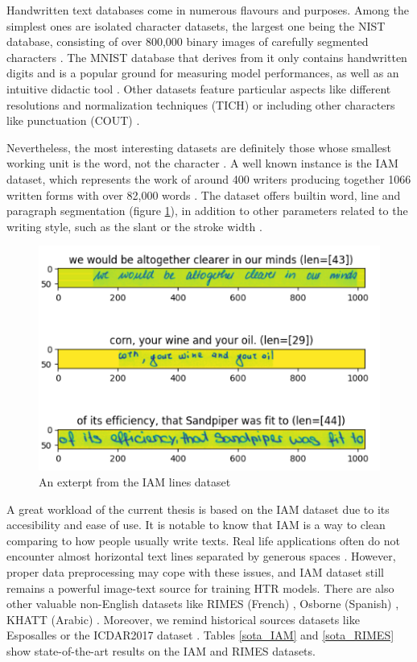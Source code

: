 Handwritten text databases come in numerous flavours and purposes. Among the simplest ones are isolated character datasets, the largest one being the NIST database, consisting of over 800,000 binary images of carefully segmented characters \cite{Juan}. The MNIST database that derives from it only contains handwritten digits and is a popular ground for measuring model performances, as well as an intuitive didactic tool \cite{Juan}. Other datasets feature particular aspects like different resolutions and normalization techniques (TICH) or including other characters like punctuation (COUT) \cite{Juan}.

Nevertheless, the most interesting datasets are definitely those whose smallest working unit is the word, not the character \cite{Juan}. A well known instance is the IAM dataset, which represents the work of around 400 writers producing together 1066 written forms with over 82,000 words \cite{IAM}. The dataset offers builtin word, line and paragraph segmentation (figure \ref{FigIAMExterpt}), in addition to other parameters related to the writing style, such as the slant or the stroke width \cite{IAM}.

\begin{figure}[htbp]
    \centering
        \includegraphics[scale=0.7]{figures/IAM_preview}
    \caption{An exterpt from the IAM lines dataset}
    \label{FigIAMExterpt}        
\end{figure}

A great workload of the current thesis is based on the IAM dataset due to its accesibility and ease of use. It is notable to know that IAM is a way to clean comparing to how people usually write texts. Real life applications often do not encounter almost horizontal text lines separated by generous spaces \cite{Juan}. However, proper data preprocessing may cope with these issues, and IAM dataset still remains a powerful image-text source for training HTR models. There are also other valuable non-English datasets like RIMES (French) \cite{Juan}, Osborne (Spanish) \cite{Juan}, KHATT (Arabic) \cite{msdoctrlite}. Moreover, we remind historical sources datasets like Esposalles \cite{msdoctrlite} or the ICDAR2017 dataset \cite{icdar}. Tables \ref{sota_IAM} and \ref{sota_RIMES} show state-of-the-art results on the IAM and RIMES datasets.

